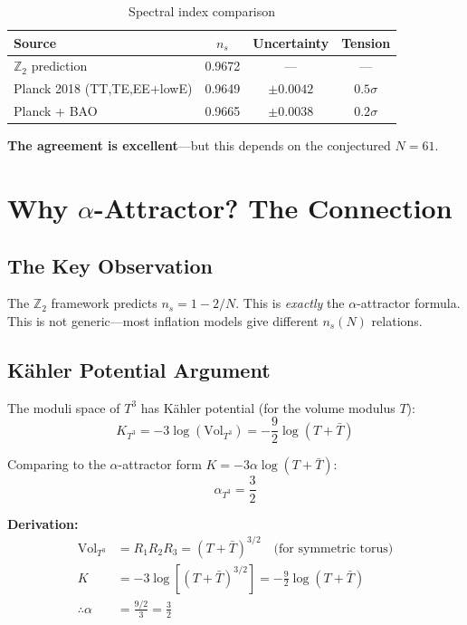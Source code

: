 \documentclass[12pt,a4paper]{article}
\begin{document}
\begin{table}[h]
\centering
\begin{tabular}{lccc}
\toprule
Source & $n_s$ & Uncertainty & Tension \\
\midrule
$\mathbb{Z}_2$ prediction & 0.9672 & --- & --- \\
Planck 2018 (TT,TE,EE+lowE) & 0.9649 & $\pm 0.0042$ & $0.5\sigma$ \\
Planck + BAO & 0.9665 & $\pm 0.0038$ & $0.2\sigma$ \\
\bottomrule
\end{tabular}
\caption{Spectral index comparison}
\end{table}

\textbf{The agreement is excellent}---but this depends on the conjectured $N = 61$.

\section{Why $\alpha$-Attractor? The Connection}

\subsection{The Key Observation}

The $\mathbb{Z}_2$ framework predicts $n_s = 1 - 2/N$. This is \textit{exactly} the $\alpha$-attractor formula. This is not generic---most inflation models give different $n_s(N)$ relations.

\subsection{K\"ahler Potential Argument}

The moduli space of $T^3$ has K\"ahler potential (for the volume modulus $T$):
\begin{equation}
K_{T^3} = -3 \log\left(\text{Vol}_{T^3}\right) = -\frac{9}{2} \log(T + \bar{T})
\end{equation}

Comparing to the $\alpha$-attractor form $K = -3\alpha \log(T + \bar{T})$:
\begin{equation}
\alpha_{T^3} = \frac{3}{2}
\end{equation}

\textbf{Derivation:}
\begin{align}
\text{Vol}_{T^3} &= R_1 R_2 R_3 = (T + \bar{T})^{3/2} \quad \text{(for symmetric torus)} \\
K &= -3 \log[(T + \bar{T})^{3/2}] = -\frac{9}{2} \log(T + \bar{T}) \\
\therefore \alpha &= \frac{9/2}{3} = \frac{3}{2}
\end{align}
\end{document}
